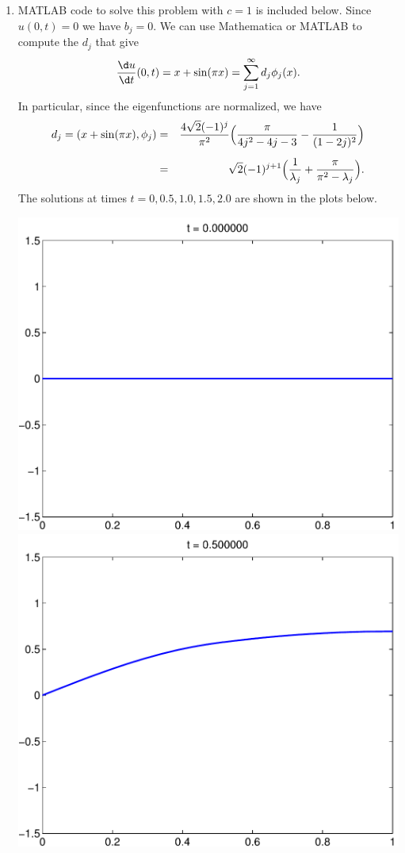 {\begin{solution}
\begin{enumerate}
\item MATLAB code to solve this problem with $c=1$ is included below.  
      Since $u(0,t) = 0$ we have  $b_j = 0$.  
      We can use Mathematica or MATLAB to compute the $d_j$ that give
      \[ {\d u \over \d t}(0,t) = x+\sin(\pi x) = \sum_{j=1}^\infty d_j \phi_j(x).\]
      In particular, since the eigenfunctions are normalized, we have
      \begin{eqnarray*}
         d_j = (x + \sin(\pi x), \phi_j) 
            &=& {4\sqrt{2} (-1)^{j}\over \pi^2}
                 \Big({\pi \over 4j^2-4j-3} - {1\over (1-2j)^2}\Big) \\[0.5em]
            &=& \sqrt{2} (-1)^{j+1}
                \Big({1\over \lambda_j} + {\pi \over \pi^2 -\lambda_j}\Big).
      \end{eqnarray*} 
      The solutions at times $t=0, 0.5, 1.0, 1.5, 2.0$ are shown in the plots below.

\begin{center}
\includegraphics[scale=0.35]{mixed_0}\quad
\includegraphics[scale=0.35]{mixed_1}


\end{center}
\end{enumerate}
\end{solution}}

